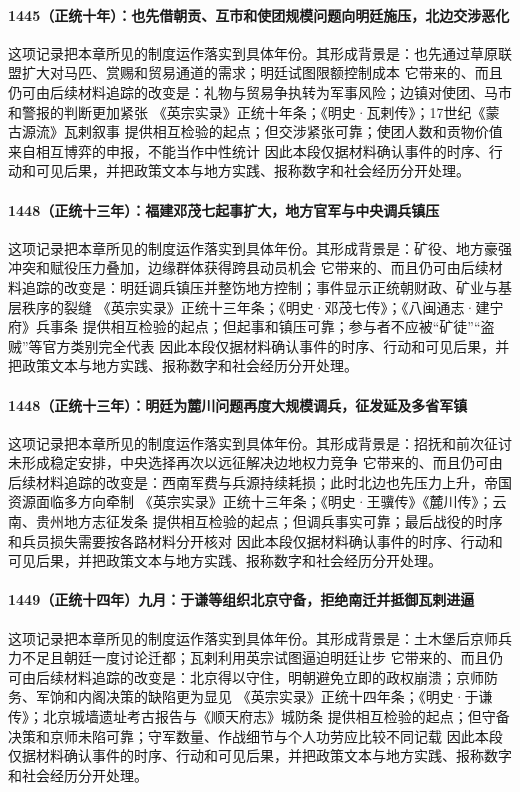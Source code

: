 \paragraph{1445（正统十年）：也先借朝贡、互市和使团规模问题向明廷施压，北边交涉恶化} 这项记录把本章所见的制度运作落实到具体年份。其形成背景是：也先通过草原联盟扩大对马匹、赏赐和贸易通道的需求；明廷试图限额控制成本 它带来的、而且仍可由后续材料追踪的改变是：礼物与贸易争执转为军事风险；边镇对使团、马市和警报的判断更加紧张 《英宗实录》正统十年条；《明史·瓦剌传》；17世纪《蒙古源流》瓦剌叙事 提供相互检验的起点；但交涉紧张可靠；使团人数和贡物价值来自相互博弈的申报，不能当作中性统计 因此本段仅据材料确认事件的时序、行动和可见后果，并把政策文本与地方实践、报称数字和社会经历分开处理。

\paragraph{1448（正统十三年）：福建邓茂七起事扩大，地方官军与中央调兵镇压} 这项记录把本章所见的制度运作落实到具体年份。其形成背景是：矿役、地方豪强冲突和赋役压力叠加，边缘群体获得跨县动员机会 它带来的、而且仍可由后续材料追踪的改变是：明廷调兵镇压并整饬地方控制；事件显示正统朝财政、矿业与基层秩序的裂缝 《英宗实录》正统十三年条；《明史·邓茂七传》；《八闽通志·建宁府》兵事条 提供相互检验的起点；但起事和镇压可靠；参与者不应被“矿徒”“盗贼”等官方类别完全代表 因此本段仅据材料确认事件的时序、行动和可见后果，并把政策文本与地方实践、报称数字和社会经历分开处理。

\paragraph{1448（正统十三年）：明廷为麓川问题再度大规模调兵，征发延及多省军镇} 这项记录把本章所见的制度运作落实到具体年份。其形成背景是：招抚和前次征讨未形成稳定安排，中央选择再次以远征解决边地权力竞争 它带来的、而且仍可由后续材料追踪的改变是：西南军费与兵源持续耗损；此时北边也先压力上升，帝国资源面临多方向牵制 《英宗实录》正统十三年条；《明史·王骥传》《麓川传》；云南、贵州地方志征发条 提供相互检验的起点；但调兵事实可靠；最后战役的时序和兵员损失需要按各路材料分开核对 因此本段仅据材料确认事件的时序、行动和可见后果，并把政策文本与地方实践、报称数字和社会经历分开处理。

\paragraph{1449（正统十四年）九月：于谦等组织北京守备，拒绝南迁并抵御瓦剌进逼} 这项记录把本章所见的制度运作落实到具体年份。其形成背景是：土木堡后京师兵力不足且朝廷一度讨论迁都；瓦剌利用英宗试图逼迫明廷让步 它带来的、而且仍可由后续材料追踪的改变是：北京得以守住，明朝避免立即的政权崩溃；京师防务、军饷和内阁决策的缺陷更为显见 《英宗实录》正统十四年条；《明史·于谦传》；北京城墙遗址考古报告与《顺天府志》城防条 提供相互检验的起点；但守备决策和京师未陷可靠；守军数量、作战细节与个人功劳应比较不同记载 因此本段仅据材料确认事件的时序、行动和可见后果，并把政策文本与地方实践、报称数字和社会经历分开处理。

